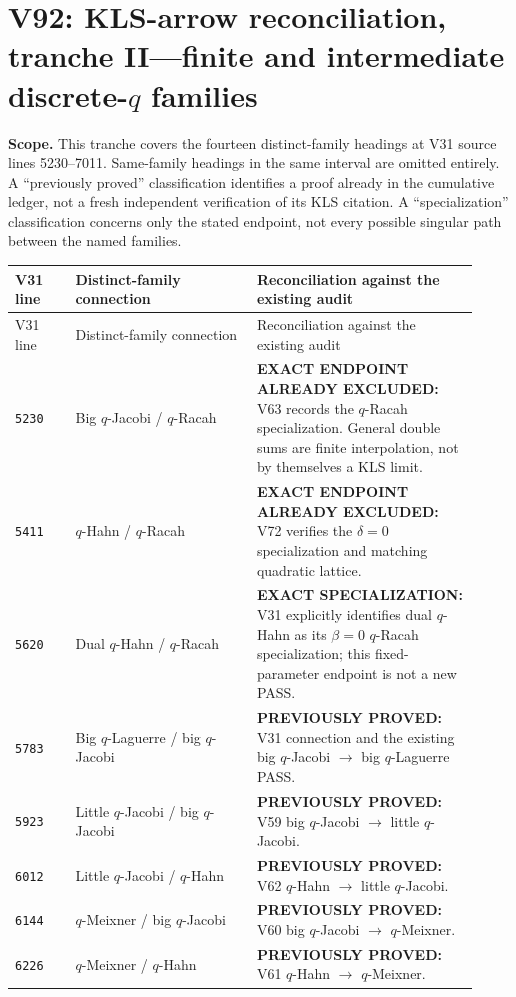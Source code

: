 \documentclass[11pt]{article}
\begin{document}
\section{V92: KLS-arrow reconciliation, tranche II---finite and intermediate discrete-$q$ families}
\noindent\textbf{Scope.} This tranche covers the fourteen distinct-family headings at V31 source lines 5230--7011. Same-family headings in the same interval are omitted entirely. A ``previously proved'' classification identifies a proof already in the cumulative ledger, not a fresh independent verification of its KLS citation. A ``specialization'' classification concerns only the stated endpoint, not every possible singular path between the named families.

\begin{longtable}{@{}p{0.12\linewidth}p{0.36\linewidth}p{0.44\linewidth}@{}}
\toprule V31 line & Distinct-family connection & Reconciliation against the existing audit \\
\midrule\endfirsthead
\toprule V31 line & Distinct-family connection & Reconciliation against the existing audit \\
\midrule\endhead
\bottomrule\endfoot
\texttt{5230} & Big $q$-Jacobi / $q$-Racah & \textbf{EXACT ENDPOINT ALREADY EXCLUDED:} V63 records the $q$-Racah specialization. General double sums are finite interpolation, not by themselves a KLS limit. \\
\texttt{5411} & $q$-Hahn / $q$-Racah & \textbf{EXACT ENDPOINT ALREADY EXCLUDED:} V72 verifies the $\delta=0$ specialization and matching quadratic lattice. \\
\texttt{5620} & Dual $q$-Hahn / $q$-Racah & \textbf{EXACT SPECIALIZATION:} V31 explicitly identifies dual $q$-Hahn as its $\beta=0$ $q$-Racah specialization; this fixed-parameter endpoint is not a new PASS. \\
\texttt{5783} & Big $q$-Laguerre / big $q$-Jacobi & \textbf{PREVIOUSLY PROVED:} V31 connection and the existing big $q$-Jacobi $\to$ big $q$-Laguerre PASS. \\
\texttt{5923} & Little $q$-Jacobi / big $q$-Jacobi & \textbf{PREVIOUSLY PROVED:} V59 big $q$-Jacobi $\to$ little $q$-Jacobi. \\
\texttt{6012} & Little $q$-Jacobi / $q$-Hahn & \textbf{PREVIOUSLY PROVED:} V62 $q$-Hahn $\to$ little $q$-Jacobi. \\
\texttt{6144} & $q$-Meixner / big $q$-Jacobi & \textbf{PREVIOUSLY PROVED:} V60 big $q$-Jacobi $\to$ $q$-Meixner. \\
\texttt{6226} & $q$-Meixner / $q$-Hahn & \textbf{PREVIOUSLY PROVED:} V61 $q$-Hahn $\to$ $q$-Meixner. \\

\end{longtable}
\end{document}

